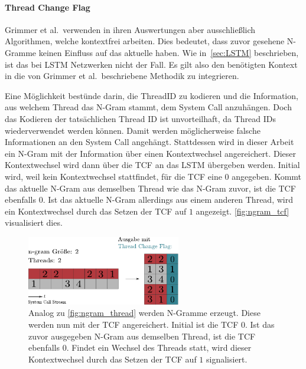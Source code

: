             \paragraph{Thread Change Flag}
                Grimmer et al.\ verwenden in ihren Auswertungen aber ausschließlich Algorithmen, welche kontextfrei arbeiten.
                Dies bedeutet, dass zuvor gesehene N-Gramme keinen Einfluss auf das aktuelle haben.
                Wie in~\autoref{sec:LSTM} beschrieben, ist das bei \ac{LSTM} Netzwerken nicht der Fall.
                Es gilt also den benötigten Kontext in die von Grimmer et al.\ beschriebene Methodik zu integrieren.\par\medskip

                Eine Möglichkeit bestünde darin, die ThreadID zu kodieren und die Information, aus welchem Thread das N-Gram stammt, dem System Call anzuhängen.
                Doch das Kodieren der tatsächlichen Thread ID ist unvorteilhaft, da Thread IDs wiederverwendet werden können.
                Damit werden möglicherweise falsche Informationen an den System Call angehängt.
                Stattdessen wird in dieser Arbeit ein N-Gram mit der Information über einen Kontextwechsel angereichert. 
                Dieser Kontextwechsel wird dann über die \ac{TCF} an das \ac{LSTM} übergeben werden.
                Initial wird, weil kein Kontextwechsel stattfindet, für die \ac{TCF} eine $0$ angegeben.
                Kommt das aktuelle N-Gram aus demselben Thread wie das N-Gram zuvor, ist die \ac{TCF} ebenfalls $0$.
                Ist das aktuelle N-Gram allerdings aus einem anderen Thread, wird ein Kontextwechsel durch das Setzen der \ac{TCF} auf $1$ angezeigt.
                \autoref{fig:ngram_tcf} visualisiert dies.\par\medskip

                \begin{figure}[ht]
                    \centering
                    \includegraphics[width=0.6\textwidth]{images/tcf.pdf}
                    \caption[Erstellung Thread Aware N-Gramme]{Analog zu \autoref{fig:ngram_thread} werden N-Gramme erzeugt.
                             Diese werden nun mit der \ac{TCF} angereichert.
                             Initial ist die \ac{TCF} $0$.
                             Ist das zuvor ausgegeben N-Gram aus demselben Thread, ist die \ac{TCF} ebenfalls $0$.
                             Findet ein Wechsel des Threads statt, wird dieser Kontextwechsel durch das Setzen der \ac{TCF} auf $1$ signalisiert.}\label{fig:ngram_tcf}
                \end{figure}

